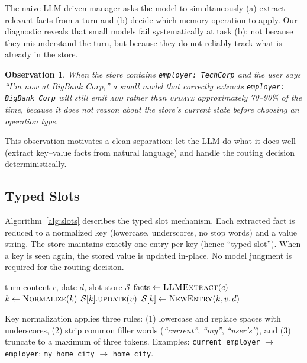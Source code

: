 \documentclass[10pt, twocolumn]{article}
\newtheorem{observation}{Observation}
\begin{document}
The naive LLM-driven manager asks the model to simultaneously (a) extract
relevant facts from a turn and (b) decide which memory operation to apply.
Our diagnostic reveals that small models fail systematically at task (b): not
because they misunderstand the turn, but because they do not reliably track
what is already in the store.

\begin{observation}
When the store contains \texttt{employer: TechCorp} and the user says
``I'm now at BigBank Corp,'' a small model that correctly extracts
\texttt{employer: BigBank Corp} will still emit \textsc{add} rather than
\textsc{update} approximately 70--90\% of the time, because it does not
reason about the store's current state before choosing an operation type.
\end{observation}

This observation motivates a clean separation: let the LLM do what it
does well (extract key--value facts from natural language) and handle
the routing decision deterministically.

\subsection{Typed Slots}
\label{sec:slots}

Algorithm~\ref{alg:slots} describes the typed slot mechanism.
Each extracted fact is reduced to a normalized key (lowercase,
underscores, no stop words) and a value string.
The store maintains exactly one entry per key (hence ``typed slot'').
When a key is seen again, the stored value is updated in-place.
No model judgment is required for the routing decision.

\begin{algorithm}[t]
\caption{Typed Slot Write}
\label{alg:slots}
\small
\begin{algorithmic}[1]
\Require turn content $c$, date $d$, slot store $\mathcal{S}$
\State $\text{facts} \leftarrow \textsc{LLMExtract}(c)$
  \State $k \leftarrow \textsc{Normalize}(k)$
    \State $\mathcal{S}[k].\textsc{update}(v)$
  \Else
    \State $\mathcal{S}[k] \leftarrow \textsc{NewEntry}(k, v, d)$
  \EndIf
\EndFor
\end{algorithmic}
\end{algorithm}

Key normalization applies three rules: (1) lowercase and replace spaces
with underscores, (2) strip common filler words
(\emph{``current''}, \emph{``my''}, \emph{``user's''}), and (3) truncate
to a maximum of three tokens.
Examples: \texttt{current\_employer} $\to$ \texttt{employer};
\texttt{my\_home\_city} $\to$ \texttt{home\_city}.
\end{document}
